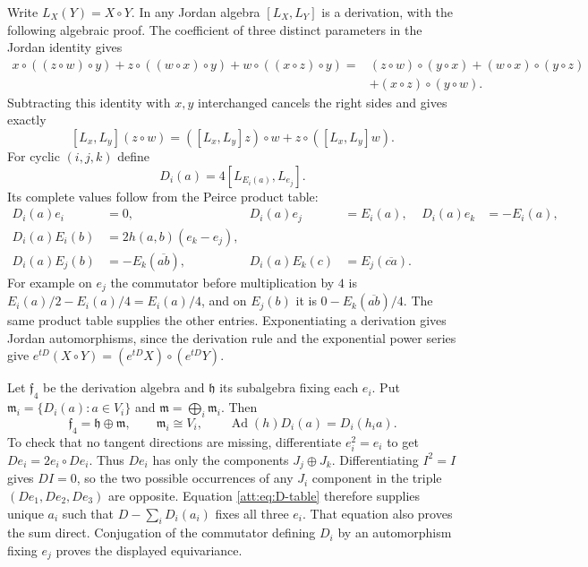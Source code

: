 \documentclass[11pt]{article}
\theoremstyle{definition}
\begin{document}
Write $L_X(Y)=X\circ Y$. In any Jordan algebra $[L_X,L_Y]$ is a
derivation, with the following algebraic proof. The coefficient of
three distinct parameters in the Jordan identity gives
\begin{align*}
x\circ((z\circ w)\circ y)+z\circ((w\circ x)\circ y)
 +w\circ((x\circ z)\circ y)
={}&(z\circ w)\circ(y\circ x)+(w\circ x)\circ(y\circ z)\\
&+(x\circ z)\circ(y\circ w).
\end{align*}
Subtracting this identity with $x,y$ interchanged cancels the right
sides and gives exactly
\[
 [L_x,L_y](z\circ w)
 =([L_x,L_y]z)\circ w+z\circ([L_x,L_y]w).
\]
For cyclic $(i,j,k)$ define
\begin{equation}
 D_i(a)=4[L_{E_i(a)},L_{e_j}].
 \label{att:eq:derivations}
\end{equation}
Its complete values follow from the Peirce product table:
\begin{align}
 D_i(a)e_i&=0,& D_i(a)e_j&=E_i(a),&
 D_i(a)e_k&=-E_i(a),\nonumber\\
 D_i(a)E_i(b)&=2h(a,b)(e_k-e_j),\label{att:eq:D-table}\\
 D_i(a)E_j(b)&=-E_k(\overline{ab}),&
 D_i(a)E_k(c)&=E_j(\overline{ca}).\nonumber
\end{align}
For example on $e_j$ the commutator before multiplication by $4$ is
$E_i(a)/2-E_i(a)/4=E_i(a)/4$, and on $E_j(b)$ it is
$0-E_k(\overline{ab})/4$. The same product table supplies the other
entries. Exponentiating a derivation gives Jordan automorphisms,
since the derivation rule and the exponential power series give
$e^{tD}(X\circ Y)=(e^{tD}X)\circ(e^{tD}Y)$.

Let $\mathfrak f_4$ be the derivation algebra and $\mathfrak h$
its subalgebra fixing each $e_i$. Put
$\mathfrak m_i=\{D_i(a):a\in V_i\}$ and
$\mathfrak m=\bigoplus_i\mathfrak m_i$. Then
\begin{equation}
 \mathfrak f_4=\mathfrak h\oplus\mathfrak m,\qquad
 \mathfrak m_i\cong V_i,\qquad
 \operatorname{Ad}(h)D_i(a)=D_i(h_i a).
 \label{att:eq:reductive}
\end{equation}
To check that no tangent directions are missing, differentiate
$e_i^2=e_i$ to get $De_i=2e_i\circ De_i$. Thus $De_i$ has only the
components $J_j\oplus J_k$. Differentiating $I^2=I$ gives $DI=0$,
so the two possible occurrences of any $J_i$ component in the triple
$(De_1,De_2,De_3)$ are opposite. Equation \eqref{att:eq:D-table}
therefore supplies unique $a_i$ such that $D-\sum_iD_i(a_i)$ fixes
all three $e_i$. That equation also proves the sum direct.
Conjugation of the commutator defining $D_i$ by an automorphism
fixing $e_j$ proves the displayed equivariance.
\end{document}

